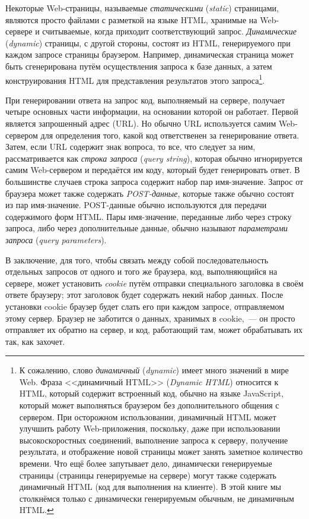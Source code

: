 Некоторые Web-страницы, называемые \textit{статическими} (\textit{static}) страницами,
являются просто файлами с разметкой на языке HTML, хранимые на Web-сервере и считываемые,
когда приходит соответствующий запрос. \textit{Динамические} (\textit{dynamic}) страницы,
с другой стороны, состоят из HTML, генерируемого при каждом запросе страницы
браузером. Например, динамическая страница может быть сгенерирована путём осуществления
запроса к базе данных, а затем конструирования HTML для представления результатов этого
запроса\footnote{К сожалению, слово \textit{динамичный} (\textit{dynamic}) имеет много
  значений в мире Web. Фраза <<динамичный HTML>> (\textit{Dynamic HTML}) относится к HTML,
  который содержит встроенный код, обычно на языке JavaScript, который может выполняться
  браузером без дополнительного общения с сервером. При осторожном использовании,
  динамичный HTML может улучшить работу Web-приложения, поскольку, даже при использовании
  высокоскоростных соединений, выполнение запроса к серверу, получение результата, и
  отображение новой страницы может занять заметное количество времени. Что ещё более
  запутывает дело, динамически генерируемые страницы (страницы генерируемые на сервере)
  могут также содержать динамичный HTML (код для выполнения на клиенте). В этой книге мы
  столкнёмся только с динамически генерируемым обычным, не динамичным HTML.}.

При генерировании ответа на запрос код, выполняемый на сервере, получает четыре основных
части информации, на основании которой он работает. Первой является запрошенный адрес
(URL). Но обычно URL используется самим Web-сервером для определения того, какой код
ответственен за генерирование ответа. Затем, если URL содержит знак вопроса, то все, что
следует за ним, рассматривается как \textit{строка запроса} (\textit{query string}),
которая обычно игнорируется самим Web-сервером и передаётся им коду, который будет
генерировать ответ. В большинстве случаев строка запроса содержит набор пар
имя-значение. Запрос от браузера может также содержать \textit{POST-данные}, которые также
обычно состоят из пар имя-значение. POST-данные обычно используются для передачи
содержимого форм HTML. Пары имя-значение, переданные либо через строку запроса, либо через
дополнительные данные, обычно называют \textit{параметрами запроса} (\textit{query
  parameters}).

В заключение, для того, чтобы связать между собой последовательность отдельных запросов от
одного и того же браузера, код, выполняющийся на сервере, может установить \textit{cookie}
путём отправки специального заголовка в своём ответе браузеру; этот заголовок будет
содержать некий набор данных. После установки cookie браузер будет слать его при каждом
запросе, отправляемом этому сервер. Браузер не заботится о данных, хранимых в cookie,~---
он просто отправляет их обратно на сервер, и код, работающий там, может обрабатывать их
так, как захочет.

